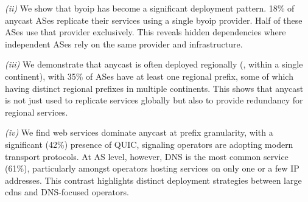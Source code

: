 \textit{(ii)}
We show that \gls{byoip} has become a significant deployment pattern.
18\% of anycast ASes replicate their services using a single \gls{byoip} provider.
Half of these ASes use that provider exclusively.
%
This reveals hidden dependencies where independent ASes
rely on the same provider and infrastructure.

\textit{(iii)}
We demonstrate that anycast is often deployed regionally (\ie, within a single continent),
with 35\% of ASes have at least one regional prefix,
some of which having distinct regional prefixes in multiple continents.
%
This shows that anycast is not just used to replicate services globally
but also to provide redundancy for regional services.
%

\textit{(iv)}
We find web services dominate anycast at prefix granularity,
with a significant (42\%) presence of QUIC,
signaling operators are adopting modern transport protocols.
%
At AS level, however, DNS is the most common service (61\%),
particularly amongst operators hosting services on only one or a few IP addresses.
This contrast highlights distinct deployment strategies between
large \glspl{cdn} and DNS-focused operators.
